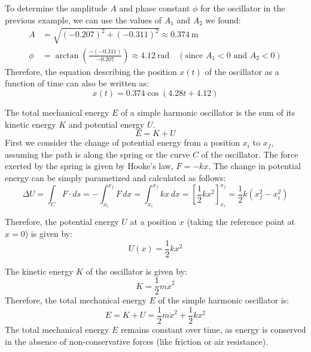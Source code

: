 \documentclass[11pt]{report}
\begin{document}
\begin{example}
    To determine the amplitude \(A\) and phase constant \(\phi\) for the oscillator in the previous example, we can use the values of \(A_1\) and \(A_2\) we found:
    \begin{align*}
        A &= \sqrt{(-0.207)^2 + (-0.311)^2} \approx 0.374\ \mathrm{m} \\
        \phi &= \arctan\!\left(\frac{-(-0.311)}{-0.207}\right) \approx 4.12\ \mathrm{rad} \quad (\text{since } A_1 < 0 \text{ and } A_2 < 0)
    \end{align*}
    Therefore, the equation describing the position \(x(t)\) of the oscillator as a function of time can also be written as:
    $$
    x(t) = 0.374 \cos(4.28 t + 4.12)
    $$
\end{example}

\begin{definition}
    The total mechanical energy \(E\) of a simple harmonic oscillator is the sum of its kinetic energy \(K\) and potential energy \(U\). 
    \begin{equation}
        E = K + U
    \end{equation}
    First we consider the change of potential energy from a position $x_i$ to $x_f$, assuming the path is along the spring or the curve $C$ of the oscillator. The force exerted by the spring is given by Hooke's law, \( F = -kx \). The change in potential energy can be simply parametized and calculated as follows:
    \begin{equation}
        \Delta U = \int_C F\cdot ds = -\int_{x_i}^{x_f} F\,dx = \int_{x_i}^{x_f} kx\,dx = \left[\frac{1}{2}kx^2\right]_{x_i}^{x_f} = \frac{1}{2}k(x_f^2 - x_i^2)
    \end{equation}

    Therefore, the potential energy \(U\) at a position \(x\) (taking the reference point at \(x=0\)) is given by:
    \begin{equation}
        U(x) = \frac{1}{2}kx^2
    \end{equation}

    The kinetic energy \(K\) of the oscillator is given by:
    \begin{equation}
        K = \frac{1}{2}m\dot{x}^2
    \end{equation}
    Therefore, the total mechanical energy \(E\) of the simple harmonic oscillator is:
    \begin{equation}
        E = K + U = \frac{1}{2}m\dot{x}^2 + \frac{1}{2}kx^2
    \end{equation}
    The total mechanical energy \(E\) remains constant over time, as energy is conserved in the absence of non-conservative forces (like friction or air resistance).

\end{definition}
\end{document}
